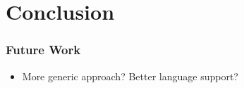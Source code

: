 
\chapter{Conclusion}\label{chapter:conclusion}
\subsection{Future Work}
\begin{itemize}
    \item More generic approach? Better language support?
\end{itemize}